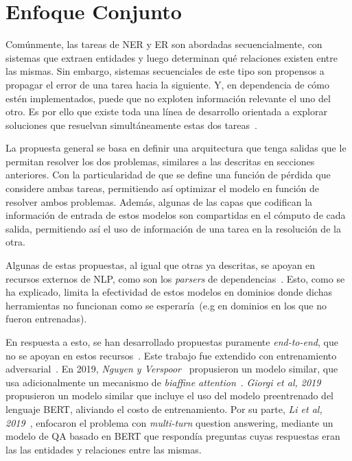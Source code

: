 \section{Enfoque Conjunto}

Comúnmente, las tareas de NER y ER son abordadas secuencialmente, con sistemas que extraen entidades y luego determinan qué relaciones existen entre las mismas.
Sin embargo, sistemas secuenciales de este tipo son propensos a propagar el error de una tarea hacia la siguiente.
Y, en dependencia de cómo estén implementados, puede que no exploten información relevante el uno del otro.
Es por ello que existe toda una línea de desarrollo orientada a explorar soluciones que resuelvan simultáneamente estas dos tareas~\cite{miwa2016end, li2017neural, bekoulis2018adversarial, bekoulis2018joint, li2019entity, nguyen2019end, giorgi2019end}.

La propuesta general se basa en definir una arquitectura que tenga salidas que le permitan resolver los dos problemas, similares a las descritas en secciones anteriores.
Con la particularidad de que se define una función de pérdida que considere ambas tareas, permitiendo así optimizar el modelo en función de resolver ambos problemas.
Además, algunas de las capas que codifican la información de entrada de estos modelos son compartidas en el cómputo de cada salida, permitiendo así el uso de información de una tarea en la resolución de la otra.

Algunas de estas propuestas, al igual que otras ya descritas, se apoyan en recursos externos de NLP, como son los \textit{parsers} de dependencias~\cite{miwa2016end, li2017neural}.
Esto, como se ha explicado, limita la efectividad de estos modelos en dominios donde dichas herramientas no funcionan como se esperaría~(e.g en dominios en los que no fueron entrenadas).

En respuesta a esto, se han desarrollado propuestas puramente \textit{end-to-end}, que no se apoyan en estos recursos~\cite{bekoulis2018joint}.
Este trabajo fue extendido con entrenamiento adversarial~\cite{bekoulis2018adversarial}.
En 2019, \textit{Nguyen y Verspoor}~\cite{nguyen2019end} propusieron un modelo similar, que usa adicionalmente un mecanismo de \textit{biaffine attention}~\cite{biaffineattention}.
\textit{Giorgi et al, 2019}~\cite{giorgi2019end} propusieron un modelo similar que incluye el uso del modelo preentrenado del lenguaje BERT, aliviando el costo de entrenamiento.
Por su parte, \textit{Li et al, 2019}~\cite{li2019entity}, enfocaron el problema con \textit{multi-turn} question answering, mediante un modelo de QA basado en BERT que respondía preguntas cuyas respuestas eran las las entidades y relaciones entre las mismas.

